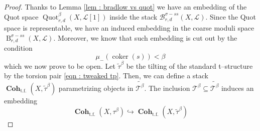 \documentclass[10pt,a4paper]{amsart}
\newcommand{\Quotbetaonerd}{\operatorname{Quot}_{r,d}^{\beta}(X,\mathcal{L}[1])}
\newcommand{\bradlb}{\operatorname{{B}}^{\sigma - ss}_{r,d}(X,\mathcal{L})}
\newcommand{\bradstacklb}{\mathcal{B}^{\sigma - ss}_{r,d}(X,\mathcal{L})}
\newcommand{\cohflat}{\boldsymbol{\operatorname{Coh}}}
\newcommand{\tbeta}{\mathcal{T}^{\beta}}
\begin{document}
\begin{proof}
    Thanks to Lemma \ref{lem : bradlow vs quot} we have an embedding of the Quot space $\Quotbetaonerd$ inside the stack $\bradstacklb$. Since the Quot space is representable, we have an induced embedding in the coarse moduli space $\bradlb$. Moreover, we know that such embedding is cut out by the condition
    \begin{equation}\label{eqn : condition bradlow vs quot}
        \mu_-(\operatorname{coker}(s)) < \beta
    \end{equation}
   which we now prove to be open. Let $\widetilde{\tau}^\beta$ be the tilting of the standard t--structure by the torsion pair \eqref{eqn : tweaked tp}. Then, we can define a stack $\cohflat_{\operatorname{t.f.}}(X,\widetilde{\tau}^{\beta})$ parametrizing objects in $\widetilde{\tbeta}$. The inclusion $\tbeta \subseteq \widetilde{\tbeta}$ induces an embedding
    \begin{equation}\label{eqn : inclusion of tbetas}
        \cohflat_{\operatorname{t.f.}}(X,{\tau}^{\beta}) \hookrightarrow \cohflat_{\operatorname{t.f.}}(X,\widetilde{{\tau}}^{\beta})
    \end{equation}

    \medskip
    

\end{proof}
\end{document}
